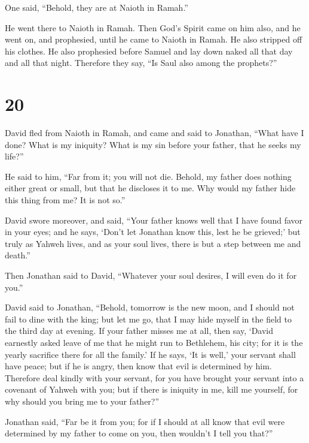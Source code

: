 One said, ``Behold, they are at Naioth in Ramah.''

 He went there to Naioth in Ramah. Then God's Spirit came
on him also, and he went on, and prophesied, until he came to Naioth in
Ramah.  He also stripped off his clothes. He also
prophesied before Samuel and lay down naked all that day and all that
night. Therefore they say, ``Is Saul also among the prophets?''

\hypertarget{section-19}{%
\section{20}\label{section-19}}

 David fled from Naioth in Ramah, and came and said to
Jonathan, ``What have I done? What is my iniquity? What is my sin before
your father, that he seeks my life?''

 He said to him, ``Far from it; you will not die. Behold, my
father does nothing either great or small, but that he discloses it to
me. Why would my father hide this thing from me? It is not so.''

 David swore moreover, and said, ``Your father knows well
that I have found favor in your eyes; and he says, `Don't let Jonathan
know this, lest he be grieved;' but truly as Yahweh lives, and as your
soul lives, there is but a step between me and death.''

 Then Jonathan said to David, ``Whatever your soul desires,
I will even do it for you.''

 David said to Jonathan, ``Behold, tomorrow is the new moon,
and I should not fail to dine with the king; but let me go, that I may
hide myself in the field to the third day at evening.  If
your father misses me at all, then say, `David earnestly asked leave of
me that he might run to Bethlehem, his city; for it is the yearly
sacrifice there for all the family.'  If he says, `It is
well,' your servant shall have peace; but if he is angry, then know that
evil is determined by him.  Therefore deal kindly with your
servant, for you have brought your servant into a covenant of Yahweh
with you; but if there is iniquity in me, kill me yourself, for why
should you bring me to your father?''

 Jonathan said, ``Far be it from you; for if I should at all
know that evil were determined by my father to come on you, then
wouldn't I tell you that?''

